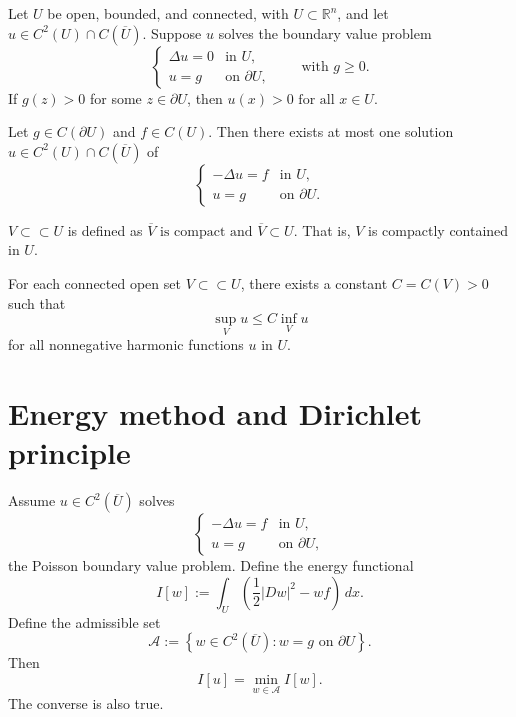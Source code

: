 \begin{theorem}[Positivity]
Let $U$ be open, bounded, and connected, with $U\subset \mathbb{R}^n$, and let
$
u\in C^2(U)\cap C(\overline{U}).
$
Suppose $u$ solves the boundary value problem
$$
\begin{cases}
\Delta u=0 & \text{in } U,\\
u=g & \text{on } \partial U,
\end{cases}
\qquad \text{with } g\ge 0.
$$
If $g(z)>0$ for some $z\in \partial U$, then
$
u(x)>0 \text{ for all } x\in U.
$
\end{theorem}

\begin{theorem}[Uniqueness]
Let $g\in C(\partial U)$ and $f\in C(U)$.
Then there exists at most one solution
$
u\in C^2(U)\cap C(\overline{U})
$
of
$$
\begin{cases}
-\Delta u=f & \text{in } U,\\
u=g & \text{on } \partial U.
\end{cases}
$$
\end{theorem}

\begin{definition}
$V\subset\subset U$ is defined as
$
\overline{V}\text{ is compact and }\overline{V}\subset U.
$
That is, $V$ is compactly contained in $U$.
\end{definition}

\begin{theorem}
For each connected open set $V\subset\subset U$, there exists a constant
$
C=C(V)>0
$
such that
$$
\sup_V u \le C \inf_V u
$$
for all nonnegative harmonic functions $u$ in $U$.
\end{theorem}

\section{Energy method and Dirichlet principle}

\begin{theorem}
Assume $u\in C^2(\overline{U})$ solves
$$
\begin{cases}
-\Delta u=f & \text{in } U,\\
u=g & \text{on } \partial U,
\end{cases}
$$
the Poisson boundary value problem.
Define the energy functional
$$
I[w]:=\int_U \left( \frac12 |Dw|^2 - wf \right)\,dx.
$$
Define the admissible set
$$
\mathcal{A}:=\left\{ w\in C^2(\overline{U}) : w=g \text{ on } \partial U \right\}.
$$
Then
$$
I[u]=\min_{w\in \mathcal{A}} I[w].
$$
The converse is also true.
\end{theorem}

